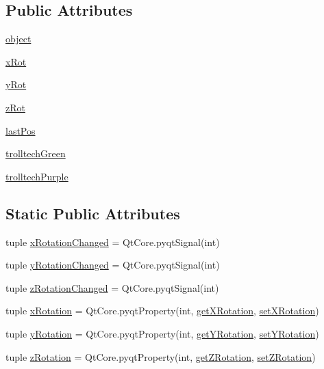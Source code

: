 \subsection*{Public Attributes}
\begin{DoxyCompactItemize}
\item 
\hyperlink{classhelloglwidget_1_1HelloGLWidget_af8c7d90c025525b242c7b7057cfd1ed9}{object}
\item 
\hyperlink{classhelloglwidget_1_1HelloGLWidget_ad463cf2da535fb17884602ceadb7b338}{x\+Rot}
\item 
\hyperlink{classhelloglwidget_1_1HelloGLWidget_af62783367204efd2b31b34c7b1bea22d}{y\+Rot}
\item 
\hyperlink{classhelloglwidget_1_1HelloGLWidget_a3e3867bbb0a1d6d41e0e57e444192ba7}{z\+Rot}
\item 
\hyperlink{classhelloglwidget_1_1HelloGLWidget_abc69d1aba616267966ddf73b8ee4d707}{last\+Pos}
\item 
\hyperlink{classhelloglwidget_1_1HelloGLWidget_a33d48298205d5ef053148e7a059d6ca9}{trolltech\+Green}
\item 
\hyperlink{classhelloglwidget_1_1HelloGLWidget_a7df7be7a10d8e4caa1cc4492942f8872}{trolltech\+Purple}
\end{DoxyCompactItemize}
\subsection*{Static Public Attributes}
\begin{DoxyCompactItemize}
\item 
tuple \hyperlink{classhelloglwidget_1_1HelloGLWidget_a4cf6de4a01397c72f2342930f1c3eb2d}{x\+Rotation\+Changed} = Qt\+Core.\+pyqt\+Signal(int)
\item 
tuple \hyperlink{classhelloglwidget_1_1HelloGLWidget_a131818acdbe34951eb840f8081dd63a3}{y\+Rotation\+Changed} = Qt\+Core.\+pyqt\+Signal(int)
\item 
tuple \hyperlink{classhelloglwidget_1_1HelloGLWidget_ab094ffd7a6378d90f67cf4f3502f2864}{z\+Rotation\+Changed} = Qt\+Core.\+pyqt\+Signal(int)
\item 
tuple \hyperlink{classhelloglwidget_1_1HelloGLWidget_a3dbfac1b297292dff9db4767587a1114}{x\+Rotation} = Qt\+Core.\+pyqt\+Property(int, \hyperlink{classhelloglwidget_1_1HelloGLWidget_a76980f298c488571d494a9c3ad499177}{get\+X\+Rotation}, \hyperlink{classhelloglwidget_1_1HelloGLWidget_a491c673f575adb3375902cf36ad5fd55}{set\+X\+Rotation})
\item 
tuple \hyperlink{classhelloglwidget_1_1HelloGLWidget_abe1ba7ee7ad66bd75e16889948dcfe8c}{y\+Rotation} = Qt\+Core.\+pyqt\+Property(int, \hyperlink{classhelloglwidget_1_1HelloGLWidget_a279ed6199381fe3c56f4284d464b2b77}{get\+Y\+Rotation}, \hyperlink{classhelloglwidget_1_1HelloGLWidget_a0a7f5047394618b28866bb29e6e7dd2e}{set\+Y\+Rotation})
\item 
tuple \hyperlink{classhelloglwidget_1_1HelloGLWidget_a44b7f231e5c88df368c32ff045c93950}{z\+Rotation} = Qt\+Core.\+pyqt\+Property(int, \hyperlink{classhelloglwidget_1_1HelloGLWidget_a6247f65654ae3f5c705fa07e8b428890}{get\+Z\+Rotation}, \hyperlink{classhelloglwidget_1_1HelloGLWidget_a329b2c8f2060d81a27982f1024efbf1b}{set\+Z\+Rotation})
\end{DoxyCompactItemize}


